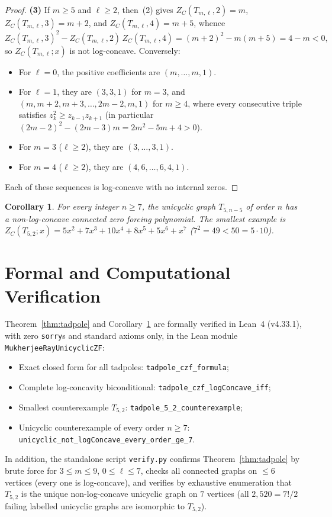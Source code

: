 \documentclass[11pt]{article}
\newtheorem{corollary}[theorem]{Corollary}
\begin{document}
\begin{proof}
\textbf{(3)} If $m \ge 5$ and $\ell \ge 2$, then~(2) gives
$Z_C(T_{m,\ell}, 2) = m$, $Z_C(T_{m,\ell}, 3) = m + 2$, and
$Z_C(T_{m,\ell}, 4) = m + 5$, whence
\[
Z_C(T_{m,\ell}, 3)^2 - Z_C(T_{m,\ell}, 2)\, Z_C(T_{m,\ell}, 4)
= (m + 2)^2 - m(m + 5) = 4 - m < 0,
\]
so $Z_C(T_{m,\ell}; x)$ is not log-concave. Conversely:
\begin{itemize}
  \item For $\ell = 0$, the positive coefficients are $(m, \dots, m, 1)$.
  \item For $\ell = 1$, they are $(3, 3, 1)$ for $m = 3$, and
        $(m, m + 2, m + 3, \dots, 2m - 2, m, 1)$ for $m \ge 4$, where every
        consecutive triple satisfies $z_k^2 \ge z_{k-1} z_{k+1}$ (in particular
        $(2m - 2)^2 - (2m - 3)m = 2m^2 - 5m + 4 > 0$).
  \item For $m = 3$ ($\ell \ge 2$), they are $(3, \dots, 3, 1)$.
  \item For $m = 4$ ($\ell \ge 2$), they are $(4, 6, \dots, 6, 4, 1)$.
\end{itemize}
Each of these sequences is log-concave with no internal zeros.
\end{proof}

\begin{corollary}\label{cor:min}
For every integer $n \ge 7$, the unicyclic graph $T_{5, n-5}$ of order $n$ has
a non-log-concave connected zero forcing polynomial. The smallest example is
$Z_C(T_{5,2}; x) = 5x^2 + 7x^3 + 10x^4 + 8x^5 + 5x^6 + x^7$
($7^2 = 49 < 50 = 5 \cdot 10$).
\end{corollary}

\section{Formal and Computational Verification}

Theorem~\ref{thm:tadpole} and Corollary~\ref{cor:min} are formally verified in
Lean~4 (v4.33.1), with zero \texttt{sorry}s and standard axioms only, in the
Lean module \texttt{MukherjeeRayUnicyclicZF}:
\begin{itemize}
  \item Exact closed form for all tadpoles: \texttt{tadpole\_czf\_formula};
  \item Complete log-concavity biconditional: \texttt{tadpole\_czf\_logConcave\_iff};
  \item Smallest counterexample $T_{5,2}$: \texttt{tadpole\_5\_2\_counterexample};
  \item Unicyclic counterexample of every order $n \ge 7$:\\
        \texttt{unicyclic\_not\_logConcave\_every\_order\_ge\_7}.
\end{itemize}
In addition, the standalone script \texttt{verify.py} confirms Theorem~\ref{thm:tadpole}
by brute force for $3 \le m \le 9$, $0 \le \ell \le 7$, checks all connected
graphs on $\le 6$ vertices (every one is log-concave), and verifies by exhaustive
enumeration that $T_{5,2}$ is the unique non-log-concave unicyclic graph on $7$
vertices (all $2{,}520 = 7!/2$ failing labelled unicyclic graphs are isomorphic
to $T_{5,2}$).
\end{document}
